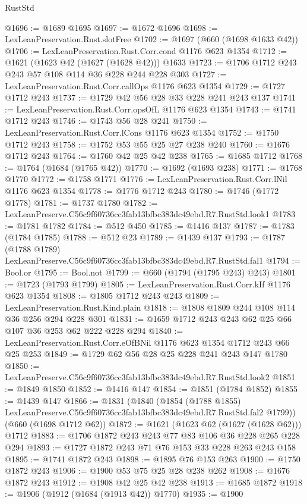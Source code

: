 \begin{lexlean}{RustStd}
\begin{coremodule}
@1696 := @1689 @1695
@1697 := @1672 @1696
@1698 := LexLeanPreservation.Rust.slotFree
@1702 := @1697 (@660 (@1698 @1633 @42))
@1706 := LexLeanPreservation.Rust.Corr.cond @1176 @623 @1354
@1712 := @1621 (@1623 @42 (@1627 (@1628 @42))) @1633
@1723 := @1706 @1712 @243 @243 @57 @108 @114 @36 @228 @244 @228 @303
@1727 := LexLeanPreservation.Rust.Corr.callOps @1176 @623 @1354
@1729 := @1727 @1712 @243
@1737 := @1729 @42 @56 @28 @33 @228 @241 @243 @137
@1741 := LexLeanPreservation.Rust.Corr.opsOfL @1176 @623 @1354
@1743 := @1741 @1712 @243
@1746 := @1743 @56 @28 @241
@1750 := LexLeanPreservation.Rust.Corr.lCons @1176 @623 @1354
@1752 := @1750 @1712 @243
@1758 := @1752 @53 @55 @25 @27 @238 @240
@1760 := @1676 @1712 @243
@1764 := @1760 @42 @25 @42 @238
@1765 := @1685 @1712
@1768 := @1764 (@1684 (@1765 @42))
@1770 := @1692 (@1693 @238)
@1771 := @1768 @1770
@1772 := @1758 @1771
@1776 := LexLeanPreservation.Rust.Corr.lNil @1176 @623 @1354
@1778 := @1776 @1712 @243
@1780 := @1746 (@1772 @1778)
@1781 := @1737 @1780
@1782 := LexLeanPreserve.C56c9f60736cc3fab13bfbc383dc49ebd.R7.RustStd.look1
@1783 := @1781 @1782
@1784 := @512 @450
@1785 := @1416 @137
@1787 := @1783 (@1784 @1785)
@1788 := @512 @23
@1789 := @1439 @137
@1793 := @1787 (@1788 @1789) LexLeanPreserve.C56c9f60736cc3fab13bfbc383dc49ebd.R7.RustStd.fal1
@1794 := Bool.or
@1795 := Bool.not
@1799 := @660 (@1794 (@1795 @243) @243)
@1801 := @1723 (@1793 @1799)
@1805 := LexLeanPreservation.Rust.Corr.kIf @1176 @623 @1354
@1808 := @1805 @1712 @243 @243
@1809 := LexLeanPreservation.Rust.Kind.plain
@1818 := @1808 @1809 @244 @108 @114 @36 @256 @294 @228 @301
@1831 := @1659 @1712 @243 @243 @62 @25 @66 @107 @36 @253 @62 @222 @228 @294
@1840 := LexLeanPreservation.Rust.Corr.eOfBNil @1176 @623 @1354 @1712 @243 @66 @25 @253
@1849 := @1729 @62 @56 @28 @25 @228 @241 @243 @147 @1780
@1850 := LexLeanPreserve.C56c9f60736cc3fab13bfbc383dc49ebd.R7.RustStd.look2
@1851 := @1849 @1850
@1852 := @1416 @147
@1854 := @1851 (@1784 @1852)
@1855 := @1439 @147
@1866 := @1831
    (@1840
      (@1854 (@1788 @1855) LexLeanPreserve.C56c9f60736cc3fab13bfbc383dc49ebd.R7.RustStd.fal2 @1799))
    (@660 (@1698 @1712 @62))
@1872 := @1621 (@1623 @62 (@1627 (@1628 @62))) @1712
@1883 := @1706 @1872 @243 @243 @77 @83 @106 @36 @228 @265 @228 @294
@1893 := @1727 @1872 @243 @71 @76 @153 @33 @228 @263 @243 @158
@1895 := @1741 @1872 @243
@1898 := @1895 @76 @153 @263
@1900 := @1750 @1872 @243
@1906 := @1900 @53 @75 @25 @28 @238 @262
@1908 := @1676 @1872 @243
@1912 := @1908 @42 @25 @42 @238
@1913 := @1685 @1872
@1918 := @1906 (@1912 (@1684 (@1913 @42)) @1770)
@1935 := @1900

\end{coremodule}
\end{lexlean}

